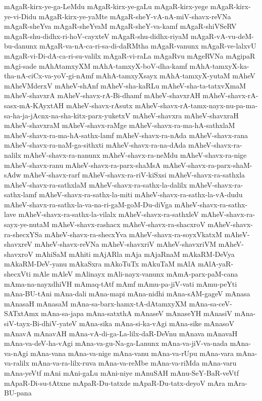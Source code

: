 {mAgaR-kirx-ye-ga-LeMdu
mAgaR-kirx-ye-gaLu
mAgaR-kirx-yege
mAgaR-kirx-ye-vi-Didu
mAgaR-kirx-ye-yaMte
mAgaR-sheY-vA-nA-miV-shavx-reVNa
mAgaR-sheYva
mAgaR-sheYvaM
mAgaR-sheY-va-kamf
mAgaR-shiVSeRV
mAgaR-shu-didhx-ri-hoV-cayxteV
mAgaR-shu-didhx-riyaM
mAgaR-vA-vu-deM-bu-danunx
mAgaR-va-nA-ca-ri-sa-di-daRMtha
mAgaR-vanunx
mAgaR-ve-lalxvU
mAgaR-vi-Di-dA-ca-ri-su-valilx
mAgaR-vi-raLa
mAgaRvu
mAgeRVNa
mAgipaR
mAgi-sade
mAhAtamxyXM
mAhA-tamxyX-boV-dha-kamf
mAhA-tamxyX-ka-tha-nA-ciCx-va-yoV-gi-nAmf
mAhA-tamxyXsayx
mAhA-tamxyX-yutaM
mAheV
mAheVMderxV
mAheV-shAnf
mAheV-sha-kaRLu
mAheV-sha-ta-tatxvXmaM
mAheV-shavxrA
mAheV-shavx-rA-Bi-dhamf
mAheV-shavxrAH
mAheV-shavx-rA-sasx-mA-KAyxtAH
mAheV-shavx-rAsutx
mAheV-shavx-rA-tamx-nayx-nu-pa-ma-sa-ha-ja-jAcnx-na-sha-kitx-parx-yuketxV
mAheV-shavxra
mAheV-shavxraH
mAheV-shavxraM
mAheV-shavx-raMge
mAheV-shavx-ra-ma-hA-sathxlaM
mAheV-shavx-ra-ma-hA-sathx-lamf
mAheV-shavx-ra-nAda
mAheV-shavx-rana
mAheV-shavx-ra-naM-ga-sithxti
mAheV-shavx-ra-na-dAda
mAheV-shavx-ra-nalilx
mAheV-shavx-ra-nanunx
mAheV-shavx-ra-neMdu
mAheV-shavx-ra-nige
mAheV-shavx-ranu
mAheV-shavx-ra-parx-shaMsA
mAheV-shavx-ra-parx-shaM-sAdw
mAheV-shavx-rarf
mAheV-shavx-ra-riV-kiSxsi
mAheV-shavx-ra-sathxla
mAheV-shavx-ra-sathxlaM
mAheV-shavx-ra-sathx-la-dalilx
mAheV-shavx-ra-sathx-lamf
mAheV-shavx-ra-sathx-la-miti
mAheV-shavx-ra-sathx-la-vA-dudu
mAheV-shavx-ra-sathx-la-va-na-ri-gaM-goM-Du-diVga
mAheV-shavx-ra-sathx-lave
mAheV-shavx-ra-sathx-la-vilalx
mAheV-shavx-ra-sathxleV
mAheV-shavx-ra-sayx-ye-nutaM
mAheV-shavx-rashacx
mAheV-shavx-ra-shacxroV
mAheV-shavx-ra-shecxYSa
mAheV-shavx-ra-shecxYva
mAheV-shavx-ra-soyxVkatxM
mAheV-shavxreV
mAheV-shavx-reVNa
mAheV-shavxriV
mAheV-shavxriVM
mAheV-shavxroV
mAhiSaM
mAhiti
mAjARla
mAja
mAjaRnaM
mAkaRM-DeVya
mAkaRM-DeV-yanu
mAkaSxra
mAkoTuTx
mAkuTaM
mAlA
mAlA-yaR-shecxVti
mAle
mAleV
mAlinayx
mAli-nayx-vanunx
mAmA-parx-paM-cana
mAma-na-nayxdhiVH
mAmaq-tAtf
mAmf
mAmu-pa-jiV-vati
mAmu-peYti
mAna-BU-tAni
mAna-dali
mAna-mapi
mAna-nidhi
mAna-sAM-gageV
mAnasa
mAnasaH
mAnasaM
mAna-sa-barx-hamx-tA-dAtamxyXM
mAna-sa-ceV-SATxtAmx
mAna-sa-japa
mAna-satxthA
mAnaseV
mAnaseYH
mAnasiV
mAna-siV-tayx-Bi-dhiV-yateV
mAna-sika
mAna-si-ka-vAgi
mAna-sike
mAnasoV
mAnavA
mAnavAH
mAna-vA-di-ga-La-lilx-daR-DeVnu
mAnava
mAnavaH
mAna-va-deV-ha-vAgi
mAna-va-gu-Na-ga-Lanunx
mAna-va-jiV-va-nada
mAna-va-nAgi
mAna-vana
mAna-va-nige
mAna-vanu
mAna-va-rUpu
mAna-vara
mAna-va-ralilx
mAna-va-ra-lilx-ruva
mAna-va-reMbe
mAna-va-riMda
mAna-varu
mAna-yeVtf
mAni
mAni-gaLu
mAni-niye
mAnuSAH
mAnu-SeY-BaR-veVtf
mApaR-Di-su-tAtxne
mApaR-Du-tatxde
mApaR-Du-tatx-deyoV
mAra
mAra-BU-pana
}

